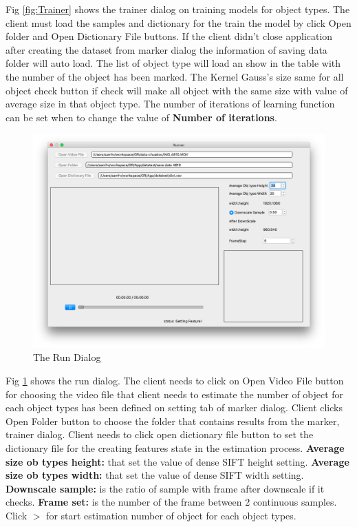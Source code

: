 Fig \ref{fig:Trainer} shows the trainer dialog on training models for object types. The client must load the samples and dictionary for the train the model by click Open folder and Open Dictionary File buttons. If the client didn't close application after creating the dataset from marker dialog the information of saving data folder will auto load. The list of object type will load an show in the table with the number of the object has been marked. The Kernel Gauss's size same for all object check button if check will make all object with the same size with value of average size in that object type. The number of iterations of learning function can be set when to change the value of \textbf{Number of iterations}. \\

\begin{center}
    \begin{figure}[H]
      \includegraphics[width=\textwidth]{Chapters/Fig/Runner}
      \caption{The Run Dialog}
      \label{fig:Runner}
  \end{figure}
\end{center}
Fig \ref{fig:Runner} shows the run dialog. The client needs to click on Open Video File button for choosing the video file that client needs to estimate the number of object for each object types has been defined on setting tab of marker dialog. Client clicks Open Folder button to choose the folder that contains results from the marker, trainer dialog. Client needs to click open dictionary file button to set the dictionary file for the creating features state in the estimation process. \textbf{Average size ob types height: } that set the value of dense SIFT height setting. \textbf{Average size ob types width: } that set the value of dense SIFT width setting. \textbf{Downscale sample: } is the ratio of sample with frame after downscale if it checks. \textbf{Frame set: } is the number of the frame between 2 continuous samples. Click $>$ for start estimation number of object for each object types. 
